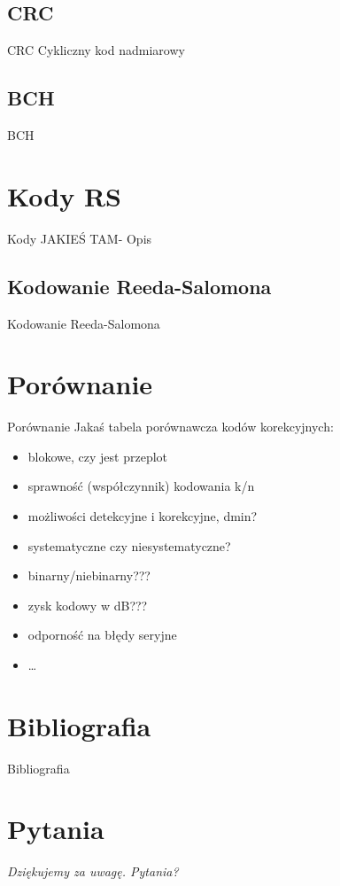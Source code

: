 \documentclass[12pt]{beamer}
\begin{document}
\subsection{CRC}
\begin{frame}{CRC}
Cykliczny kod nadmiarowy

\subsection{BCH}
\begin{frame}{BCH}
\end{frame}

\end{frame}
	

\section{Kody RS}
\begin{frame}{Kody JAKIEŚ TAM- Opis}
\setcounter{section}{1}

\end{frame}

\subsection{Kodowanie Reeda-Salomona}
\begin{frame}{Kodowanie Reeda-Salomona}

\end{frame}

\section{Porównanie}
\begin{frame}{Porównanie}
Jakaś tabela porównawcza kodów korekcyjnych:
\begin{itemize}
		\item blokowe, czy jest przeplot
		\item sprawność (współczynnik) kodowania k/n
		\item możliwości detekcyjne i korekcyjne, dmin?
		\item systematyczne czy niesystematyczne?
		\item binarny/niebinarny???
		\item zysk kodowy w dB???
		\item odporność na błędy seryjne
		\item \ldots
\end{itemize}
		
\end{frame}

\section{Bibliografia}
\begin{frame}{Bibliografia}
	
\end{frame}

\section*{Pytania}
\begin{frame}
	\centering \Large\emph{Dziękujemy za uwagę. Pytania?}
\end{frame}
\end{document}
